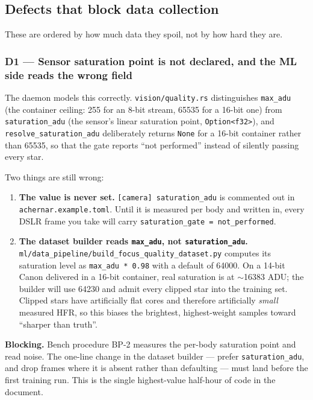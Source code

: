 \documentclass[11pt]{article}
\newcommand{\co}[1]{\texttt{\small #1}}
\begin{document}
\subsection{Defects that block data collection}\label{sec:defects}

These are ordered by how much data they spoil, not by how hard they are.

\subsubsection*{D1 --- Sensor saturation point is not declared, and the ML side reads the wrong field}

The daemon models this correctly. \co{vision/quality.rs} distinguishes
\co{max\_adu} (the container ceiling: 255 for an 8-bit stream, 65535 for a
16-bit one) from \co{saturation\_adu} (the sensor's linear saturation point,
\co{Option<f32>}), and \co{resolve\_saturation\_adu} deliberately returns
\co{None} for a 16-bit container rather than 65535, so that the gate reports
``not performed'' instead of silently passing every star.

Two things are still wrong:

\begin{enumerate}
\item \textbf{The value is never set.} \co{[camera] saturation\_adu} is
      commented out in \co{achernar.example.toml}. Until it is measured per body
      and written in, every DSLR frame you take will carry
      \co{saturation\_gate = not\_performed}.
\item \textbf{The dataset builder reads \co{max\_adu}, not \co{saturation\_adu}.}
      \co{ml/data\_pipeline/build\_focus\_quality\_dataset.py} computes its
      saturation level as \co{max\_adu * 0.98} with a default of 64000. On a
      14-bit Canon delivered in a 16-bit container, real saturation is at
      $\sim$16383 ADU; the builder will use 64230 and admit every clipped star
      into the training set. Clipped stars have artificially flat cores and
      therefore artificially \emph{small} measured HFR, so this biases the
      brightest, highest-weight samples toward ``sharper than truth''.
\end{enumerate}

\begin{redbox}
\textbf{Blocking.} Bench procedure BP-2 measures the per-body saturation point
and read noise. The one-line change in the dataset builder --- prefer
\co{saturation\_adu}, and drop frames where it is absent rather than defaulting
--- must land before the first training run. This is the single highest-value
half-hour of code in the document.
\end{redbox}
\end{document}
